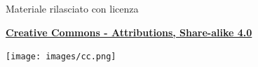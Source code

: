 \documentclass{beamer}
\begin{document}












\begin{frame}

\begin{center}
    \bigskip
    Materiale rilasciato con licenza
    
    \textbf{\href{http://creativecommons.org/licenses/by-sa/4.0/}{Creative Commons - Attributions, Share-alike 4.0}}
    
    \medskip
    \texttt{[image: images/cc.png]}
\end{center}

\end{frame}
\end{document}
